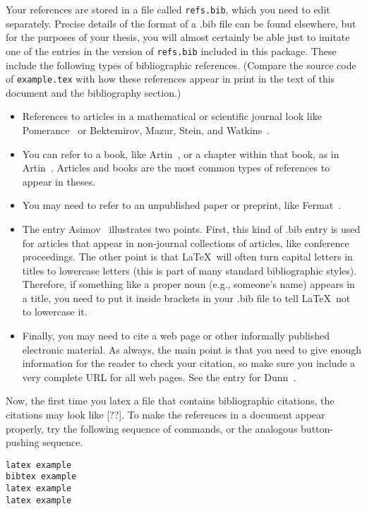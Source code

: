 \documentclass[modernstyle,12pt]{sjsuthesis}
\theoremstyle{definition}
\begin{document}
Your references are stored in a file called {\tt refs.bib}, which you
need to edit separately.  Precise details of the format of a .bib file
can be found elsewhere, but for the purposes of your thesis, you will
almost certainly be able just to imitate one of the entries in the
version of {\tt refs.bib\/} included in this package.  These include
the following types of bibliographic references.  (Compare the source
code of {\tt example.tex\/} with how these references appear in print
in the text of this document and the bibliography section.)
\begin{itemize}
\item References to articles in a mathematical or scientific journal
  look like Pomerance~\cite{Pomerance:Sieve} or Bektemirov, Mazur,
  Stein, and Watkins~\cite{BMSW:EllipticCurves}.
\item You can refer to a book, like Artin~\cite{Artin:Algebra}, or a
  chapter within that book, as in Artin~\cite[Ch.\ 4]{Artin:Algebra}.
  Articles and books are the most common types of references to appear
  in theses.
\item You may need to refer to an unpublished paper or preprint, like
  Fermat~\cite{F:LastTheorem}.
\item The entry Asimov~\cite{Asimov:Again} illustrates two points.
  First, this kind of .bib entry is used for articles that appear in
  non-journal collections of articles, like conference proceedings.
  The other point is that \LaTeX\ will often turn capital letters in
  titles to lowercase letters (this is part of many standard
  bibliographic styles).  Therefore, if something like a proper noun
  (e.g., someone's name) appears in a title, you need to put it inside
  brackets in your .bib file to tell \LaTeX\ not to lowercase it.
\item Finally, you may need to cite a web page or other informally
  published electronic material.  As always, the main point is that
  you need to give enough information for the reader to check your
  citation, so make sure you include a very complete URL for all web
  pages.  See the entry for Dunn~\cite{Dunn:Computability}.
\end{itemize}

Now, the first time you latex a file that contains bibliographic
citations, the citations may look like [??].  To make the references
in a document appear properly, try the following sequence of commands,
or the analogous button-pushing sequence.

\begin{verbatim}
latex example
bibtex example
latex example
latex example
\end{verbatim}
\end{document}

